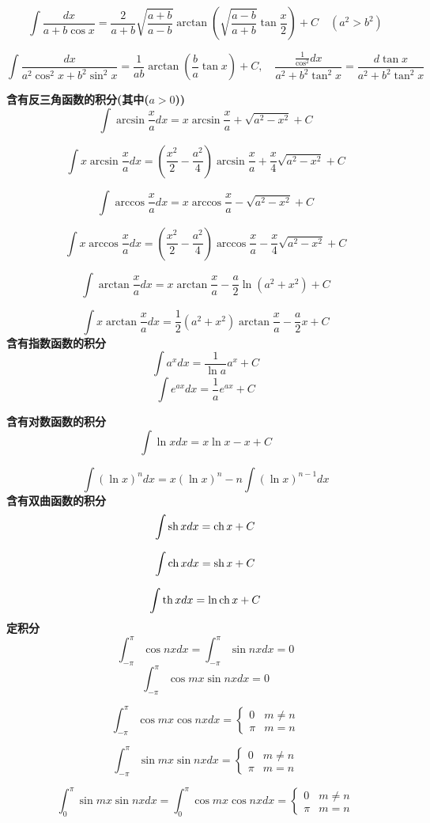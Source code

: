 \documentclass{book}
\begin{document}
$$
\int \frac{dx}{a+b\cos x}=\frac{2}{a+b} \sqrt{\frac{a+b}{a-b}}\arctan(\sqrt{\frac{a-b}{a+b}}\tan \frac{x}{2})+C \quad (a^2>b^2)
$$


$$
\int \frac{ dx}{a^2 \cos^2 x+b^2\sin^2 x}=\frac{ 1}{ab} \arctan(\frac{b}{a}\tan x)+C, \quad
\frac{\frac{1}{\cos^2}dx}{a^2+b^2\tan^2 x}=\frac{d \tan x}{a^2 + b^2 \tan^2 x}
$$

\textbf{含有反三角函数的积分(其中($a>0$))}
$$
\int \arcsin \frac{x}{a}dx=x\arcsin \frac{x}{a}+\sqrt{a^2-x^2}+C
$$

$$
\int x\arcsin \frac{x}{a}dx=(\frac{x^2}{2}-\frac{ a^2}{4})\arcsin \frac{x}{a}+ \frac{x}{4}\sqrt{a^2-x^2}+C
$$

$$
\int \arccos \frac{x}{a}dx=x \arccos \frac{x}{a}-\sqrt{a^2-x^2}+C
$$

$$
\int x\arccos \frac{x}{a}dx=(\frac{x^2}{2}-\frac{ a^2}{4})\arccos \frac{x}{a}- \frac{x}{4}\sqrt{a^2-x^2}+C
$$

$$
\int \arctan \frac{x}{a}dx=x \arctan \frac{x}{a}-\frac{a}{2}\ln(a^2+x^2)+C
$$

$$
\int x \arctan \frac{x}{a}dx=\frac{1}{2}(a^2+x^2)\arctan \frac{x}{a}- \frac{a}{2}x+C
$$
\textbf{含有指数函数的积分}
$$
\int a^xdx=\frac{1}{\ln a}a^x+C
$$
$$
\int e^{ax}dx=\frac{ 1}{a}e^{ax}+C
$$

\textbf{含有对数函数的积分}
$$
\int \ln xdx=x\ln x-x +C
$$

$$
\int (\ln x)^n dx=x(\ln x)^n -n \int (\ln x)^{n-1}dx
$$
\textbf{含有双曲函数的积分}
$$
\int \operatorname{sh} xdx=\operatorname{ch} x+C
$$

$$
\int \operatorname{ch} xdx=\operatorname{sh} x+C
$$

$$
\int \operatorname{th} xdx=\ln \operatorname{ch} x+C
$$
\textbf{定积分}
$$
\int_{-\pi}^{\pi} \cos nx dx=
\int_{-\pi}^{\pi} \sin nx dx=0
$$
$$
\int_{-\pi}^{\pi} \cos mx\sin nx dx=0
$$

$$
\int_{-\pi}^{\pi} \cos mx\cos nx dx=
\left\{
		\begin{array}{ll}
		 0 & m \neq n \\
		 \pi & m = n
		\end{array}
		\right.
$$

$$
\int_{-\pi}^{\pi} \sin mx\sin nx dx=
\left\{
		\begin{array}{ll}
		 0 & m \neq n \\
		 \pi & m = n
		\end{array}
		\right.
$$

$$
\int_{0}^{\pi} \sin mx\sin nx dx=
\int_{0}^{\pi} \cos mx\cos nx dx=
\left\{
		\begin{array}{ll}
		 0 & m \neq n \\
		 \pi & m = n
		\end{array}
		\right.
$$
\end{document}
